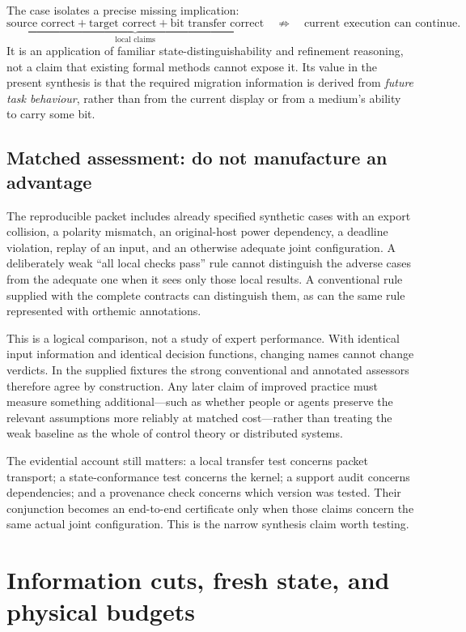 \documentclass[11pt,a4paper]{article}
\theoremstyle{definition}
\theoremstyle{remark}
\begin{document}
The case isolates a precise missing implication:
\[
 \underbrace{\text{source correct} + \text{target correct} + \text{bit transfer correct}}_{\text{local claims}}
 \quad\not\Rightarrow\quad \text{current execution can continue}.
\]
It is an application of familiar state-distinguishability and refinement reasoning, not a claim that existing formal methods cannot expose it. Its value in the present synthesis is that the required migration information is derived from \emph{future task behaviour}, rather than from the current display or from a medium's ability to carry some bit.

\subsection{Matched assessment: do not manufacture an advantage}
The reproducible packet includes already specified synthetic cases with an export collision, a polarity mismatch, an original-host power dependency, a deadline violation, replay of an input, and an otherwise adequate joint configuration. A deliberately weak ``all local checks pass'' rule cannot distinguish the adverse cases from the adequate one when it sees only those local results. A conventional rule supplied with the complete contracts can distinguish them, as can the same rule represented with orthemic annotations.

This is a logical comparison, not a study of expert performance. With identical input information and identical decision functions, changing names cannot change verdicts. In the supplied fixtures the strong conventional and annotated assessors therefore agree by construction. Any later claim of improved practice must measure something additional---such as whether people or agents preserve the relevant assumptions more reliably at matched cost---rather than treating the weak baseline as the whole of control theory or distributed systems.

The evidential account still matters: a local transfer test concerns packet transport; a state-conformance test concerns the kernel; a support audit concerns dependencies; and a provenance check concerns which version was tested. Their conjunction becomes an end-to-end certificate only when those claims concern the same actual joint configuration. This is the narrow synthesis claim worth testing.


\section{Information cuts, fresh state, and physical budgets}\label{sec:cuts}
\end{document}
